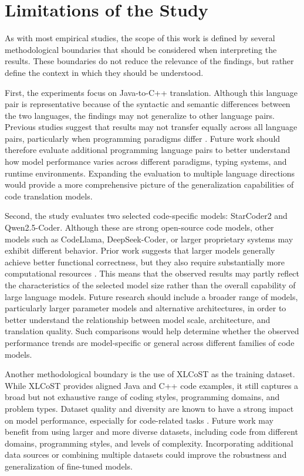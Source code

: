 \chapter{Limitations of the Study}



As with most empirical studies, the scope of this work is defined by several
methodological boundaries that should be considered when interpreting the
results. These boundaries do not reduce the relevance of the findings, but
rather define the context in which they should be understood.

First, the experiments focus on Java-to-C++ translation. Although this
language pair is representative because of the syntactic and semantic
differences between the two languages, the findings may not generalize to other
language pairs. Previous studies suggest that results may not transfer equally across all
language pairs, particularly when programming paradigms differ
\cite{llm_limitations}. Future work should therefore evaluate additional
programming language pairs to better understand how model performance varies
across different paradigms, typing systems, and runtime environments. Expanding
the evaluation to multiple language directions would provide a more
comprehensive picture of the generalization capabilities of code translation
models.

Second, the study evaluates two selected code-specific models: StarCoder2 and Qwen2.5-Coder. Although
these are strong open-source code models, other models such as CodeLlama,
DeepSeek-Coder, or larger proprietary systems may exhibit different behavior.
Prior work suggests that larger models generally achieve better functional
correctness, but they also require substantially more computational resources
\cite{llm_survey}. This means that the observed results may partly reflect the
characteristics of the selected model size rather than the overall capability of
large language models. Future research should include a broader range of models,
particularly larger parameter models and alternative architectures, in order to
better understand the relationship between model scale, architecture, and
translation quality. Such comparisons would help determine whether the observed
performance trends are model-specific or general across different families of
code models.

Another methodological boundary is the use of XLCoST as the training dataset. While XLCoST provides aligned Java and C++ code examples, it
still captures a broad but not exhaustive range of coding styles, programming
domains, and problem types. Dataset quality and diversity are known to have a strong impact
on model performance, especially for code-related tasks \cite{zhu2022xlcost}.
Future work may benefit from using larger and more diverse datasets, including
code from different domains, programming styles, and levels of complexity.
Incorporating additional data sources or combining multiple datasets could
improve the robustness and generalization of fine-tuned models.

